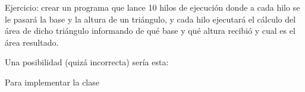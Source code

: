 \documentclass[letterpaper,10pt,spanish]{sphinxmanual}
\begin{document}
\begin{sphinxVerbatim}[commandchars=\\\{\}]
   
           \PYG{o}{[}\PYG{o}{]}  
                 \PYG{o}{[}\PYG{o}{]} \PYG{o}{[}\PYG{o}{]}
                   
                        \PYG{o}{[}\PYG{o}{]} 
                          \PYG{o}{[}\PYG{o}{]}
                         
\end{sphinxVerbatim}

Ejercicio: crear un programa que lance 10 hilos de ejecución donde a cada hilo se le pasará la base y la altura de un triángulo, y cada hilo ejecutará el cálculo del área de dicho triángulo informando de qué base y qué altura recibió y cual es el área resultado.

Una posibilidad (quizá incorrecta) sería esta:

Para implementar la clase 
\end{document}
